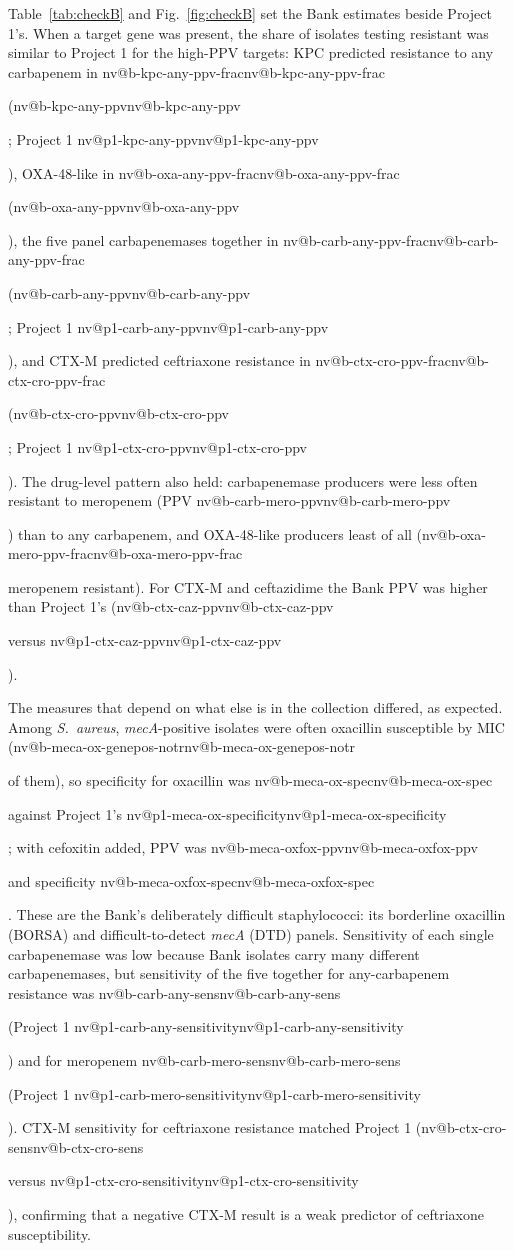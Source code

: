 \documentclass[10pt,twocolumn,letterpaper]{article}
\makeatletter
\newcommand{\nv}[1]{\ifcsname nv@#1\endcsname\csname nv@#1\endcsname\else
  \PackageError{numbers}{Unknown number key: #1}{Run build_assets.py}\fi}
\newcommand{\g}[1]{\textit{#1}}  %
\newcommand{\sau}{\textit{S.~aureus}}
\makeatother
\begin{document}
Table~\ref{tab:checkB} and Fig.~\ref{fig:checkB} set the Bank estimates beside Project 1's. When a target gene was
present, the share of isolates testing resistant was similar to Project 1 for the high-PPV targets: KPC predicted
resistance to any carbapenem in \nv{b-kpc-any-ppv-frac} (\nv{b-kpc-any-ppv}; Project 1 \nv{p1-kpc-any-ppv}), OXA-48-like in \nv{b-oxa-any-ppv-frac}
(\nv{b-oxa-any-ppv}), the five panel carbapenemases together in \nv{b-carb-any-ppv-frac} (\nv{b-carb-any-ppv}; Project 1
\nv{p1-carb-any-ppv}), and CTX-M predicted ceftriaxone resistance in \nv{b-ctx-cro-ppv-frac} (\nv{b-ctx-cro-ppv}; Project
1 \nv{p1-ctx-cro-ppv}). The drug-level pattern also held: carbapenemase producers were less often resistant to meropenem
(PPV \nv{b-carb-mero-ppv}) than to any carbapenem, and OXA-48-like producers least of all (\nv{b-oxa-mero-ppv-frac}
meropenem resistant). For CTX-M and ceftazidime the Bank PPV was higher than Project 1's (\nv{b-ctx-caz-ppv} versus
\nv{p1-ctx-caz-ppv}).

The measures that depend on what else is in the collection differed, as expected. Among \sau{}, \g{mecA}-positive
isolates were often oxacillin susceptible by MIC (\nv{b-meca-ox-genepos-notr} of them), so specificity for oxacillin was
\nv{b-meca-ox-spec} against Project 1's \nv{p1-meca-ox-specificity}; with cefoxitin added, PPV was \nv{b-meca-oxfox-ppv}
and specificity \nv{b-meca-oxfox-spec}. These are the Bank's deliberately difficult staphylococci: its borderline
oxacillin (BORSA) and difficult-to-detect \g{mecA} (DTD) panels. Sensitivity of each single carbapenemase was low because
Bank isolates carry many different carbapenemases, but sensitivity of the five together for any-carbapenem resistance was
\nv{b-carb-any-sens} (Project 1 \nv{p1-carb-any-sensitivity}) and for meropenem \nv{b-carb-mero-sens} (Project 1
\nv{p1-carb-mero-sensitivity}). CTX-M sensitivity for ceftriaxone resistance matched Project 1 (\nv{b-ctx-cro-sens} versus
\nv{p1-ctx-cro-sensitivity}), confirming that a negative CTX-M result is a weak predictor of ceftriaxone susceptibility.

\begin{table}[t]
\caption{Check B: Project 1 rules applied to independent Bank isolates (Bank) beside Project 1's U.S. estimates (P1).
$n$ is Bank isolates with an interpretable result; PPV and sensitivity also give Bank counts. Enterobacterales exclude
\textit{Salmonella}; enterococci are \textit{E.~faecalis} and \textit{E.~faecium}. -- , not estimable.}
\label{tab:checkB}
\centering\footnotesize

\end{table}
\end{document}
